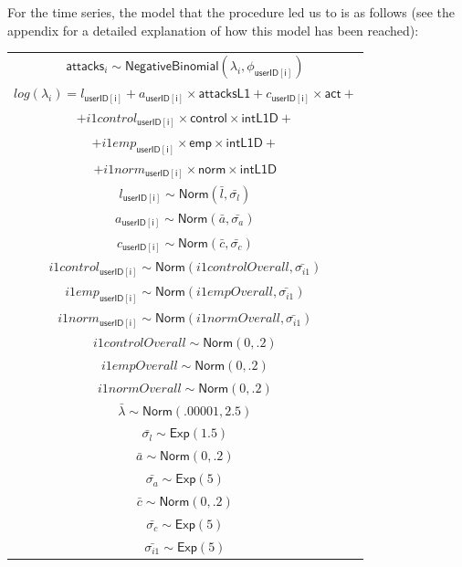 \documentclass[preprint,12pt]{elsarticle}
\begin{document}
For the time series, the model that the procedure led us to is as follows (see the appendix for a detailed explanation of how this model has been reached):

\footnotesize

\begin{center}
\begin{tabular}{c}
$\mathsf{attacks}_i  \sim  \mathsf{NegativeBinomial}(\lambda_i, \phi_{\mathsf{userID[i]}} ) $\\
$log(\lambda_i)  =  l_{\mathsf{userID[i]}} +
                  a_{\mathsf{userID[i]}} \times \mathsf{attacksL1} +
                  c_{\mathsf{userID[i]}} \times \mathsf{act} + $\\
$                   + 
       i1control_{\mathsf{userID[i]}} \times  \mathsf{control} \times \mathsf{intL1D}  +$ \\$         +  i1emp_{\mathsf{userID[i]}} \times  \mathsf{emp} \times \mathsf{intL1D}  +$ \\$
              +  i1norm_{\mathsf{userID[i]}} \times  \mathsf{norm} \times \mathsf{intL1D}
                          $\\ 
$  l_{\mathsf{userID[i]}}   \sim \textsf{Norm}(\bar{l}, \bar{\sigma_l}) $\\
$  a_{\mathsf{userID[i]}}  \sim \textsf{Norm}(\bar{a}, \bar{\sigma_a}) $\\
$  c_{\mathsf{userID[i]}}  \sim \textsf{Norm}(\bar{c}, \bar{\sigma_c}) $\\
 $ i1control_{\mathsf{userID[i]}}  \sim  \textsf{Norm}(i1controlOverall,\bar{\sigma_{i1}})$ \\
$   i1emp_{\mathsf{userID[i]}}  \sim  \textsf{Norm}(i1empOverall, \bar{\sigma_{i1}})$\\  
 $ i1norm_{\mathsf{userID[i]}}   \sim  
     \textsf{Norm}(i1normOverall, \bar{\sigma_{i1}})$\\
$     i1controlOverall  \sim  \textsf{Norm}(0,.2)$\\
$    i1empOverall   \sim  \textsf{Norm}(0,.2) $\\
$    i1normOverall   \sim  \textsf{Norm}(0,.2) $\\
$    \bar{\lambda}   \sim  \textsf{Norm}(.00001, 2.5) $\\
$    \bar{\sigma_l}  \sim  \mathsf{Exp}(1.5)$\\
$    \bar{a}  \sim \textsf{Norm}(0, .2) $\\
$    \bar{\sigma_a}  \sim  \mathsf{Exp}(5) $\\
$    \bar{c}  \sim  \mathsf{Norm}(0, .2)$\\
$    \bar{\sigma_c}  \sim \mathsf{Exp}(5) $\\
$    \bar{\sigma_{i1}}  \sim  \mathsf{Exp}(5)
$
\end{tabular}
\end{center}
\end{document}
